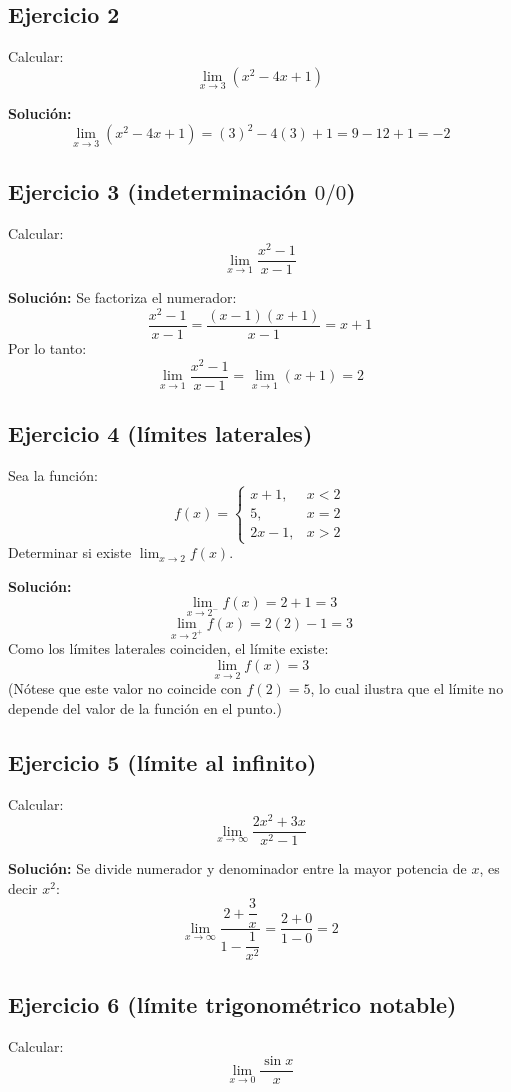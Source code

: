\documentclass[12pt]{article}
\begin{document}
\subsection{Ejercicio 2}
Calcular:
\[
\lim_{x \to 3} (x^2 - 4x + 1)
\]

\textbf{Solución:}
\[
\lim_{x \to 3} (x^2 - 4x + 1) = (3)^2 - 4(3) + 1 = 9 - 12 + 1 = -2
\]

\subsection{Ejercicio 3 (indeterminación $0/0$)}
Calcular:
\[
\lim_{x \to 1} \frac{x^2 - 1}{x - 1}
\]

\textbf{Solución:}
Se factoriza el numerador:
\[
\frac{x^2 - 1}{x - 1} = \frac{(x-1)(x+1)}{x-1} = x + 1
\]
Por lo tanto:
\[
\lim_{x \to 1} \frac{x^2 - 1}{x - 1} = \lim_{x \to 1} (x+1) = 2
\]

\subsection{Ejercicio 4 (límites laterales)}
Sea la función:
\[
f(x) =
\begin{cases}
x + 1, & x < 2 \\
5, & x = 2 \\
2x - 1, & x > 2
\end{cases}
\]
Determinar si existe $\displaystyle \lim_{x \to 2} f(x)$.

\textbf{Solución:}
\[
\lim_{x \to 2^-} f(x) = 2 + 1 = 3
\]
\[
\lim_{x \to 2^+} f(x) = 2(2) - 1 = 3
\]
Como los límites laterales coinciden, el límite existe:
\[
\lim_{x \to 2} f(x) = 3
\]
(Nótese que este valor no coincide con $f(2) = 5$, lo cual ilustra que el límite no depende del valor de la función en el punto.)

\subsection{Ejercicio 5 (límite al infinito)}
Calcular:
\[
\lim_{x \to \infty} \frac{2x^2 + 3x}{x^2 - 1}
\]

\textbf{Solución:}
Se divide numerador y denominador entre la mayor potencia de $x$, es decir $x^2$:
\[
\lim_{x \to \infty} \frac{2 + \dfrac{3}{x}}{1 - \dfrac{1}{x^2}} = \frac{2 + 0}{1 - 0} = 2
\]

\subsection{Ejercicio 6 (límite trigonométrico notable)}
Calcular:
\[
\lim_{x \to 0} \frac{\sin x}{x}
\]
\end{document}
